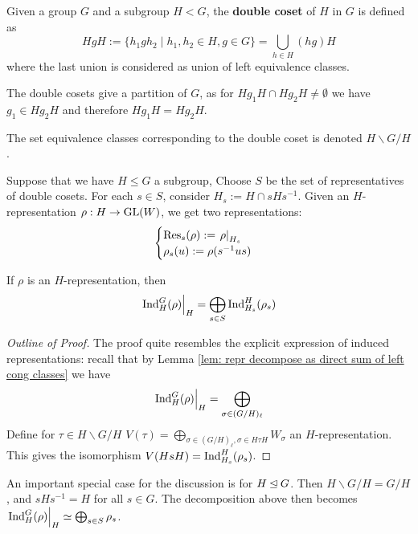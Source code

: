 \documentclass{article}
\begin{document}
\begin{definition}
    Given a group $G$ and a subgroup $H < G$, the \textbf{double coset} of $H$ in $G$ is defined as
    \[
        HgH := \{ h_1 g h_2 \mid h_1, h_2 \in H, g \in G \} = \bigcup_{h \in H} (hg) H
    \]
    where the last union is considered as union of left equivalence classes.
\end{definition}

\begin{remark}
    The double cosets give a partition of $G$, as for $H g_1 H \cap H g_2 H \neq \emptyset$ we have $g_1 \in H g_2 H$ and therefore $H g_1 H = H g_2 H$.
\end{remark}

\begin{notation}
    The set equivalence classes corresponding to the double coset is denoted $H \backslash G / H$.
\end{notation}

Suppose that we have $H \leq G$ a subgroup, Choose $S$ be the set of representatives of double cosets. For each $s \in S$, consider $H_s := H \cap s H s^{-1}$. Given an $H$-representation $\rho: H \to \mathrm{GL}(W)$, we get two representations:
\[
    \begin{cases}
        \mathrm{Res}_s (\rho) := \left.\rho\right|_{H_s} \\
        \rho_s(u) := \rho(s^{-1} u s)
    \end{cases}
\]

\begin{theorem}\label{thm: decomposition of restrction of induced repr}
    If $\rho$ is an $H$-representation, then
    \[
        \left.\mathrm{Ind}_H^G (\rho)\right|_{H} = \bigoplus_{s \in S} \mathrm{Ind}_{H_s}^H (\rho_s)
    \]
\end{theorem}

\begin{proof}[Outline of Proof]
    The proof quite resembles the explicit expression of induced representations: recall that by Lemma \ref{lem: repr decompose as direct sum of left cong classes} we have
    \[
        \left.\mathrm{Ind}_H^G (\rho)\right|_{H} = \bigoplus_{\sigma \in (G/H)_{\ell}}
    \]
    Define for $\tau \in H\backslash G/H$ $V(\tau) = \bigoplus_{\sigma \in (G/H)_{\ell}, \sigma \in H\tau H} W_{\sigma}$ an $H$-representation. This gives the isomorphism $V(HsH) = \mathrm{Ind}_{H_s}^H (\rho_s)$.
\end{proof}

\begin{remark}
    An important special case for the discussion is for $H \unlhd G$. Then $H \backslash G/H = G/H$, and $sHs^{-1} = H$ for all $s \in G$. The decomposition above then becomes $\left.\mathrm{Ind}_H^G (\rho)\right|_{H} \simeq \bigoplus_{s \in S} \rho_s$.
\end{remark}
\end{document}
